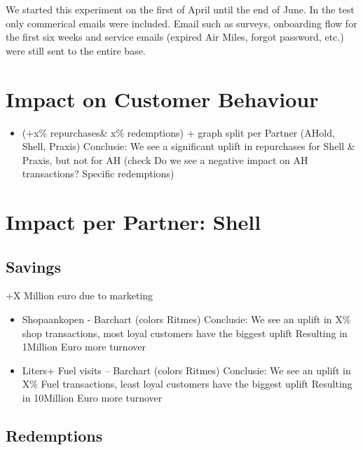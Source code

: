 \documentclass[
  10pt,
]{article}
\providecommand{\tightlist}{%
  \setlength{\itemsep}{0pt}\setlength{\parskip}{0pt}}
\begin{document}
We started this experiment on the first of April until the end of June.
In the test only commerical emails were included. Email such as surveys,
onboarding flow for the first six weeks and service emails (expired Air
Miles, forgot password, etc.) were still sent to the entire base.

\hypertarget{impact-on-customer-behaviour}{%
\section{Impact on Customer
Behaviour}\label{impact-on-customer-behaviour}}

\begin{itemize}
\tightlist
\item
  (+x\% repurchases\& x\% redemptions) + graph split per Partner (AHold,
  Shell, Praxis) Conclusie: We see a significant uplift in repurchases
  for Shell \& Praxis, but not for AH (check Do we see a negative impact
  on AH transactions? Specific redemptions)
\end{itemize}

\hypertarget{impact-per-partner-shell}{%
\section{Impact per Partner: Shell}\label{impact-per-partner-shell}}

\hypertarget{savings}{%
\subsection{Savings}\label{savings}}

+X Million euro due to marketing

\begin{itemize}
\item
  Shopaankopen - Barchart (colors Ritmes) Conclusie: We see an uplift in
  X\% shop transactions, most loyal customers have the biggest uplift
  Resulting in 1Million Euro more turnover
\item
  Liters+ Fuel visits -- Barchart (colors Ritmes) Conclusie: We see an
  uplift in X\% Fuel transactions, least loyal customers have the
  biggest uplift Resulting in 10Million Euro more turnover
\end{itemize}

\hypertarget{redemptions}{%
\subsection{Redemptions}\label{redemptions}}
\end{document}
